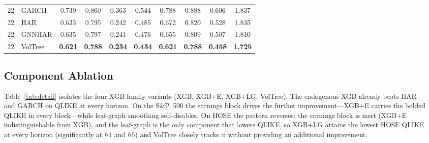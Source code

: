 \documentclass[runningheads,a4paper]{llncs}
\begin{document}
\begin{table}[t]
\begin{tabular}{ll cccc cccc}
\midrule
22 & GARCH    & 0.739 & 0.860 & 0.363 & 0.544 & 0.788 & 0.888 & 0.606 & 1.837 \\
22 & HAR      & 0.633 & 0.795 & 0.242 & 0.485 & 0.672 & 0.820 & 0.528 & 1.835 \\
22 & GNNHAR   & 0.635 & 0.797 & 0.241 & 0.476 & 0.655 & 0.809 & 0.507 & 1.810 \\
22 & VolTree & \textbf{0.621} & \textbf{0.788} & \textbf{0.234} & \textbf{0.434} & \textbf{0.621} & \textbf{0.788} & \textbf{0.458} & \textbf{1.725} \\
\bottomrule
\end{tabular}
\end{table}

\subsection{Component Ablation}
Table~\ref{tab:detail} isolates the four XGB-family variants (XGB, XGB+E, XGB+LG, VolTree). The endogenous
XGB already beats HAR and GARCH on QLIKE at every horizon. On the S\&P~500 the earnings block drives the
further improvement---XGB+E carries the bolded QLIKE in every block---while leaf-graph smoothing
self-disables. On HOSE the pattern reverses: the earnings block is inert (XGB+E indistinguishable from
XGB), and the leaf-graph is the only component that lowers QLIKE, so XGB+LG attains the lowest HOSE QLIKE at
every horizon (significantly at $h1$ and $h5$) and VolTree closely tracks it without providing an additional
improvement.
\end{document}

